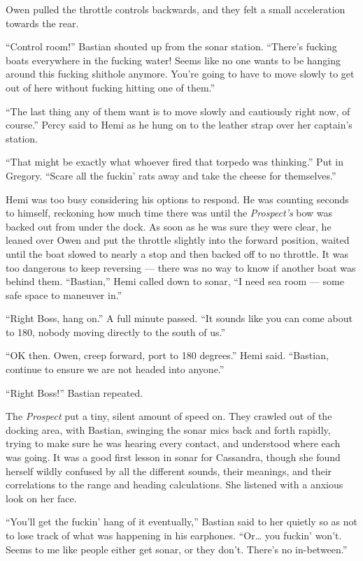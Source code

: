 \documentclass[]{scrbook}
\begin{document}
Owen pulled the throttle controls backwards, and they felt a small
acceleration towards the rear.

``Control room!'' Bastian shouted up from the sonar station. ``There's
fucking boats everywhere in the fucking water! Seems like no one wants
to be hanging around this fucking shithole anymore. You're going to have
to move slowly to get out of here without fucking hitting one of them.''

``The last thing any of them want is to move slowly and cautiously right
now, of course.'' Percy said to Hemi as he hung on to the leather strap
over her captain's station.

``That might be exactly what whoever fired that torpedo was thinking.''
Put in Gregory. ``Scare all the fuckin' rats away and take the cheese
for themselves.''

Hemi was too busy considering his options to respond. He was counting
seconds to himself, reckoning how much time there was until the
\emph{Prospect's} bow was backed out from under the dock. As soon as he
was sure they were clear, he leaned over Owen and put the throttle
slightly into the forward position, waited until the boat slowed to
nearly a stop and then backed off to no throttle. It was too dangerous
to keep reversing --- there was no way to know if another boat was
behind them. ``Bastian,'' Hemi called down to sonar, ``I need sea room
--- some safe space to maneuver in.''

``Right Boss, hang on.'' A full minute passed. ``It sounds like you can
come about to 180, nobody moving directly to the south of us.''

``OK then. Owen, creep forward, port to 180 degrees.'' Hemi said.
``Bastian, continue to ensure we are not headed into anyone.''

``Right Boss!'' Bastian repeated.

The \emph{Prospect} put a tiny, silent amount of speed on. They crawled
out of the docking area, with Bastian, swinging the sonar mics back and
forth rapidly, trying to make sure he was hearing every contact, and
understood where each was going. It was a good first lesson in sonar for
Cassandra, though she found herself wildly confused by all the different
sounds, their meanings, and their correlations to the range and heading
calculations. She listened with a anxious look on her face.

``You'll get the fuckin' hang of it eventually,'' Bastian said to her
quietly so as not to lose track of what was happening in his earphones.
``Or\ldots{} you fuckin' won't. Seems to me like people either get
sonar, or they don't. There's no in-between.''
\end{document}
